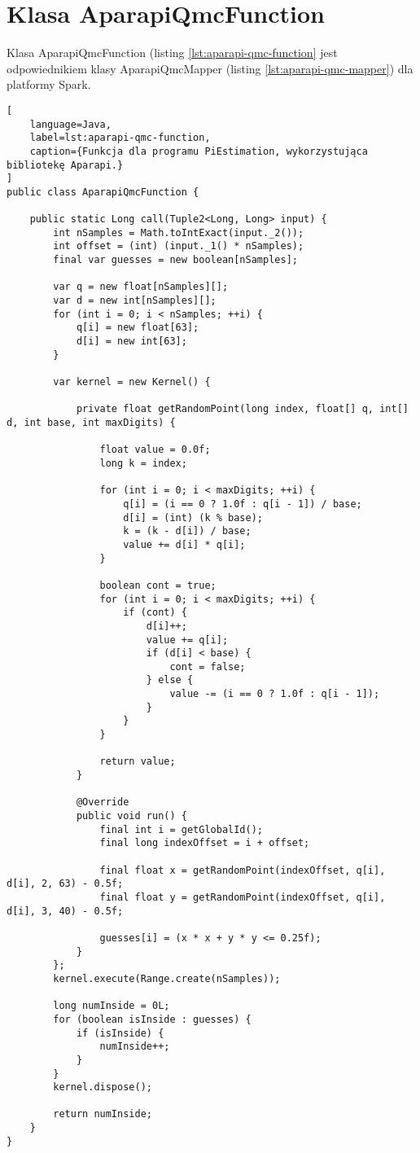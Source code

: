 \section*{Klasa AparapiQmcFunction} \label{ch:aparapi-qmc-function}

Klasa AparapiQmcFunction (listing \ref{lst:aparapi-qmc-function} jest odpowiednikiem klasy AparapiQmcMapper
(listing \ref{lst:aparapi-qmc-mapper}) dla platformy Spark.

\begin{lstlisting}[
    language=Java,
    label=lst:aparapi-qmc-function,
    caption={Funkcja dla programu PiEstimation, wykorzystująca bibliotekę Aparapi.}
]
public class AparapiQmcFunction {

    public static Long call(Tuple2<Long, Long> input) {
        int nSamples = Math.toIntExact(input._2());
        int offset = (int) (input._1() * nSamples);
        final var guesses = new boolean[nSamples];

        var q = new float[nSamples][];
        var d = new int[nSamples][];
        for (int i = 0; i < nSamples; ++i) {
            q[i] = new float[63];
            d[i] = new int[63];
        }

        var kernel = new Kernel() {

            private float getRandomPoint(long index, float[] q, int[] d, int base, int maxDigits) {

                float value = 0.0f;
                long k = index;

                for (int i = 0; i < maxDigits; ++i) {
                    q[i] = (i == 0 ? 1.0f : q[i - 1]) / base;
                    d[i] = (int) (k % base);
                    k = (k - d[i]) / base;
                    value += d[i] * q[i];
                }

                boolean cont = true;
                for (int i = 0; i < maxDigits; ++i) {
                    if (cont) {
                        d[i]++;
                        value += q[i];
                        if (d[i] < base) {
                            cont = false;
                        } else {
                            value -= (i == 0 ? 1.0f : q[i - 1]);
                        }
                    }
                }

                return value;
            }

            @Override
            public void run() {
                final int i = getGlobalId();
                final long indexOffset = i + offset;

                final float x = getRandomPoint(indexOffset, q[i], d[i], 2, 63) - 0.5f;
                final float y = getRandomPoint(indexOffset, q[i], d[i], 3, 40) - 0.5f;

                guesses[i] = (x * x + y * y <= 0.25f);
            }
        };
        kernel.execute(Range.create(nSamples));

        long numInside = 0L;
        for (boolean isInside : guesses) {
            if (isInside) {
                numInside++;
            }
        }
        kernel.dispose();

        return numInside;
    }
}
\end{lstlisting}
\newpage

